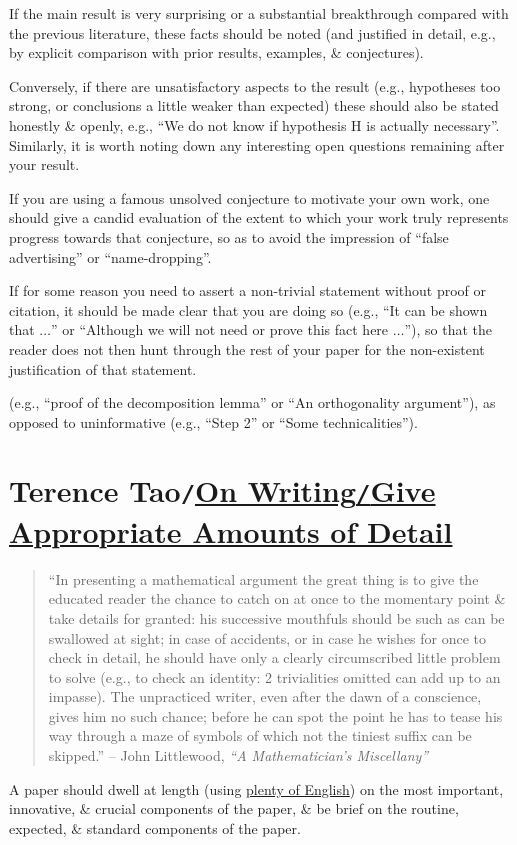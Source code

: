 \documentclass[oneside]{book}
\numberwithin{equation}{section}
\begin{document}
If the main result is very surprising or a substantial breakthrough compared with the previous literature, these facts should be noted (and justified in detail, e.g., by explicit comparison with prior results, examples, \& conjectures).

Conversely, if there are unsatisfactory aspects to the result (e.g., hypotheses too strong, or conclusions a little weaker than expected) these should also be stated honestly \& openly, e.g., ``We do not know if hypothesis H is actually necessary''. Similarly, it is worth noting down any interesting open questions remaining after your result.

If you are using a famous unsolved conjecture to motivate your own work, one should give a candid evaluation of the extent to which your work truly represents progress towards that conjecture, so as to avoid the impression of ``false advertising'' or ``name-dropping''.

If for some reason you need to assert a non-trivial statement without proof or citation, it should be made clear that you are doing so (e.g., ``It can be shown that $\ldots$'' or ``Although we will not need or prove this fact here $\ldots$''), so that the reader does not then hunt through the rest of your paper for the non-existent justification of that statement.

 (e.g., ``proof of the decomposition lemma'' or ``An orthogonality argument''), as opposed to uninformative (e.g., ``Step 2'' or ``Some technicalities'').

\section{Terence Tao\texttt{/}\href{https://terrytao.wordpress.com/advice-on-writing-papers/give-appropriate-amounts-of-detail/}{On Writing\texttt{/}Give Appropriate Amounts of Detail}}
\begin{quotation}
	``In presenting a mathematical argument the great thing is to give the educated reader the chance to catch on at once to the momentary point \& take details for granted: his successive mouthfuls should be such as can be swallowed at sight; in case of accidents, or in case he wishes for once to check in detail, he should have only a clearly circumscribed little problem to solve (e.g., to check an identity: 2 trivialities omitted can add up to an impasse). The unpracticed writer, even after the dawn of a conscience, gives him no such chance; before he can spot the point he has to tease his way through a maze of symbols of which not the tiniest suffix can be skipped.'' -- John Littlewood, \textit{``A Mathematician's Miscellany''}
\end{quotation}
A paper should dwell at length (using \href{https://terrytao.wordpress.com/advice-on-writing-papers/take-advantage-of-the-english-language/}{plenty of English}) on the most important, innovative, \& crucial components of the paper, \& be brief on the routine, expected, \& standard components of the paper.
\end{document}
